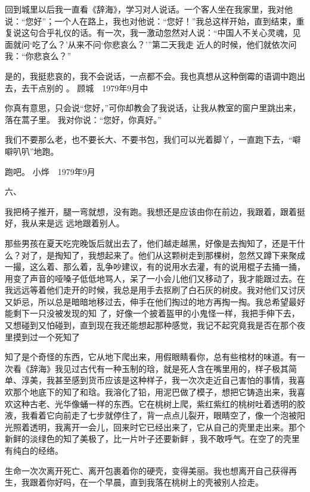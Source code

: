 \documentclass{article}
\begin{document}
回到城里以后我一直看《辞海》，学习对人说话。一个客人坐在我家里，我对他说：“您好”；一个人在路上，我也对他说：“您好！”我总这样开始，直到结束，重复说这句合乎礼仪的话。有一次，我一激动忽然对人说：“中国人不关心灵魂，见面就问‘吃了么？’从来不问‘你悲哀么？’”第二天我走
近人的时候，他们就依次问我：“你悲哀么？” 

是的，我挺悲哀的，我不会说话，一点都不会。我也真想从这种倒霉的语调中跑出去，去干点别的
。 顾城　1979年9月中 



你真有意思，只会说“您好，”可你却教会了我说话，让我从教室的窗户里跳出来，落在蒿子里。
我对你说：“您好，你真好。” 

我们不要那么老，也不要长大、不要书包，我们可以光着脚丫，一直跑下去，“噼噼叭叭”地跑。
\newpage



跑吧。 小烨　1979年9月 


六、 



我把椅子推开，腿一弯就想，没有跑。我想还是应该由你在前边，我跟着，跟着挺好，我从来是远
远地跟着别人。 

那些男孩在夏天吃完晚饭后就出去了，他们越走越黑，好像是去掏知了，还是干什么？对了，是掏知了，我想起来了。他们从这颗树走到那棵树，忽然又蹲下来聚成一撮，这么着、那么着，乱争吵建议，有的说用水去灌，有的说用棍子去捅一捅，用变了声音的哑嗓子低低地骂人，呆了一小会儿他们又移动了，我才能跟过去。在我远远等着他们走开的时候，我总是用手去抠刷了白石灰的树皮。我对他们又讨厌又妒忌，所以总是暗暗地移过去，伸手在他们掏过的地方再掏一掏。我总希望最好能剩下一只没被发现的知
\newpage
了，好像一个披着盔甲的小鬼怪一样，我把手伸下去，又想碰到又怕碰到，直到现在我还能想起那种感觉，我记不起究竟我是否在那个夜里摸到过一个死知了

知了是个奇怪的东西，它从地下爬出来，用假眼睛看你，总有些棺材的味道。有一次看《辞海》我见过古代有一种玉制的琀，就是死人含在嘴里用的，样子极其简单、淳美，我甚至感到货币应该是这种样子，我一次次走近自己害怕的事情，我喜欢那个地底下的知了和琀。我溶化了铅，用泥巴做了模子，想把它铸造出来，我喜欢这种古老、光华像蛹一样的东西。它在桃树上爬，紫红紫红的桃树吐着透明的胶液，我看着它向前走了七步就停住了，背一点点儿裂开，眼睛空了，像一个泡被阳光照着透明，我离开一会儿，回来时它已经出来了，它从自己的壳里走出来。那个新鲜的淡绿色的知了美极了，比一片叶子还要新鲜
，我不敢呼气。在空了的壳里有纯白的经络。 

生命一次次离开死亡、离开包裹着你的硬壳，变得美丽。我也想离开自己获得再生，我跟着你好吗，在一个早晨，直到我落在桃树上的壳被别人捡走。
\newpage
\end{document}

